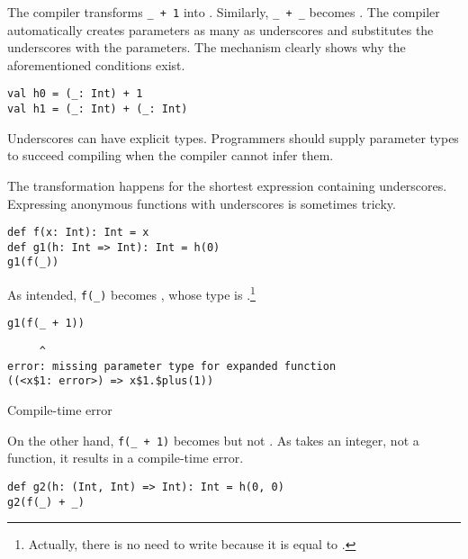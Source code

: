 The compiler transforms \verb!_ + 1! into .
Similarly, \verb!_ + _!
becomes . The compiler automatically creates parameters
as many as underscores and substitutes the underscores with the parameters. The
mechanism clearly shows why the aforementioned conditions exist.

\begin{verbatim}
val h0 = (_: Int) + 1
val h1 = (_: Int) + (_: Int)
\end{verbatim}

Underscores can have explicit types.
Programmers should supply parameter types to succeed compiling when
the compiler cannot infer them.

The transformation happens for the shortest expression containing underscores.
Expressing anonymous functions with underscores is sometimes tricky.

\begin{verbatim}
def f(x: Int): Int = x
def g1(h: Int => Int): Int = h(0)
g1(f(_))
\end{verbatim}

As intended, \verb!f(_)! becomes , whose type is .\footnote{Actually, there is no need to write
 because it is equal to .}

\begin{verbatim}
g1(f(_ + 1))
\end{verbatim}
\vspace{-1em}
\begin{mdframed}[hidealllines=true,backgroundcolor=red!10,innerleftmargin=3pt,innerrightmargin=3pt,leftmargin=-3pt,rightmargin=-3pt]
\begin{verbatim}
     ^
error: missing parameter type for expanded function
((<x$1: error>) => x$1.$plus(1))
\end{verbatim}
\vspace{-2em}
\begin{flushright}
\scriptsize\textsf{Compile-time error}
\end{flushright}
\end{mdframed}

On the other hand, \verb!f(_ + 1)! becomes
 but not .
As  takes an integer, not a function, it results in a compile-time error.

\begin{verbatim}
def g2(h: (Int, Int) => Int): Int = h(0, 0)
g2(f(_) + _)
\end{verbatim}

